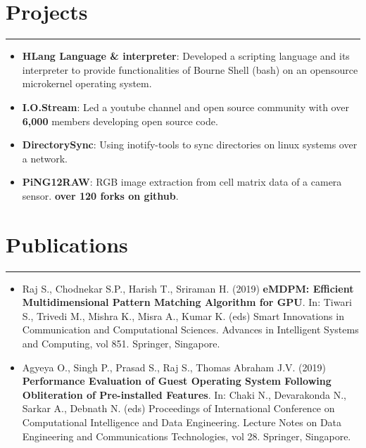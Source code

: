 \documentclass[a4paper,6pt]{article}
\begin{document}
\vspace{-9px}
\section*{Projects}
\vspace{-8px}
\hrule
\vspace{4px}
\hspace{5px}
\begin{itemize}
    \item \textbf{HLang Language \& interpreter}: \small Developed a scripting language and its interpreter to provide functionalities of Bourne Shell (bash) on an opensource microkernel operating system.
\normalsize
\vspace{2px}
	\item \textbf{I.O.Stream}: \small Led a youtube channel and open source community with over \textcolor{mygray}{\textbf{6,000}} members developing open source code.
\vspace{2px}
\normalsize
	\item \textbf{DirectorySync}: \small Using inotify-tools to sync directories on linux systems over a network.
\vspace{2px}
\normalsize
	\item \textbf{PiNG12RAW}: \small RGB image extraction from cell matrix data of a camera sensor. \textcolor{mygray}{\textbf{over 120 forks on github}}. 
\normalsize
\end{itemize}

\vspace{-9px}
\section*{Publications}
\vspace{-8px}
\hrule
\vspace{8px}
\begin{itemize}
	\item \small Raj S., Chodnekar S.P., Harish T., Sriraman H. (2019) \textcolor{mygray}{\textbf{eMDPM: Efficient Multidimensional Pattern Matching Algorithm for GPU}}. In: Tiwari S., Trivedi M., Mishra K., Misra A., Kumar K. (eds) Smart Innovations in Communication and Computational Sciences. Advances in Intelligent Systems and Computing, vol 851. Springer, Singapore. 
\normalsize
\vspace{2px}
	\item \small Agyeya O., Singh P., Prasad S., Raj S., Thomas Abraham J.V. (2019) \textcolor{mygray}{\textbf{Performance Evaluation of Guest Operating System Following Obliteration of Pre-installed Features}}. In: Chaki N., Devarakonda N., Sarkar A., Debnath N. (eds) Proceedings of International Conference on Computational Intelligence and Data Engineering. Lecture Notes on Data Engineering and Communications Technologies, vol 28. Springer, Singapore.
\normalsize
\end{itemize}
\end{document}
